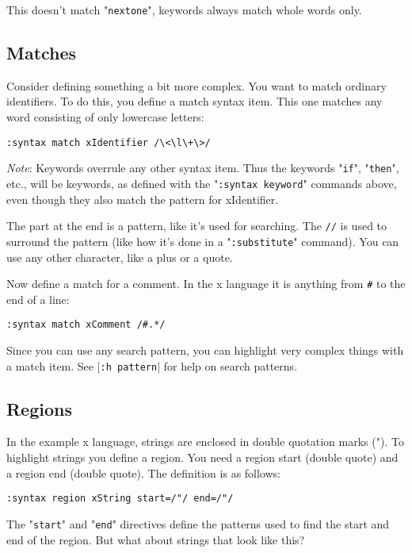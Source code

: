 This doesn't match "\texttt{nextone}", keywords always match whole words only.
\subsection{Matches}
Consider defining something a bit more complex.
You want to match ordinary identifiers.
To do this, you define a match syntax item.
This one matches any word consisting of only lowercase letters:

\begin{Verbatim}[samepage=true]
 :syntax match xIdentifier /\<\l\+\>/
\end{Verbatim}
 
\emph{Note}: Keywords overrule any other syntax item.
Thus the keywords "\texttt{if}", "\texttt{then}", etc., will be keywords, as defined with the "\texttt{:syntax keyword}" commands above, even though they also match the pattern for xIdentifier.

The part at the end is a pattern, like it's used for searching.
The \texttt{//} is used to surround the pattern (like how it's done in a "\texttt{:substitute}" command).
You can use any other character, like a plus or a quote.

Now define a match for a comment.
In the x language it is anything from \texttt{\#} to the end of a line:

\begin{Verbatim}[samepage=true]
 :syntax match xComment /#.*/
\end{Verbatim}

Since you can use any search pattern, you can highlight very complex things with a match item.
See |\texttt{:h pattern}| for help on search patterns.
\subsection{Regions}

In the example x language, strings are enclosed in double quotation marks (").
To highlight strings you define a region.
You need a region start (double quote) and a region end (double quote).
The definition is as follows:

\begin{Verbatim}[samepage=true]
 :syntax region xString start=/"/ end=/"/
\end{Verbatim}

The "\texttt{start}" and "\texttt{end}" directives define the patterns used to find the start and end of the region.
But what about strings that look like this?

